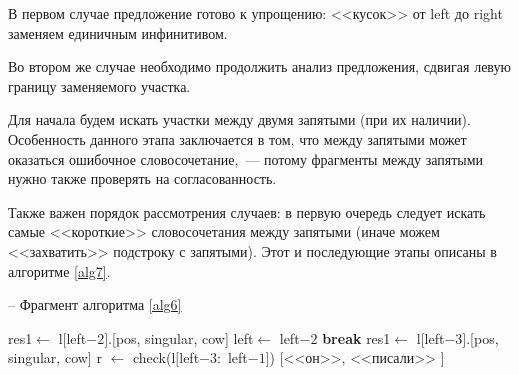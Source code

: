 \documentclass[main]{subfiles}
\begin{document}
В первом случае предложение готово к упрощению: <<кусок>> от left до right заменяем единичным инфинитивом.

Во втором же случае необходимо продолжить анализ предложения, сдвигая левую границу заменяемого участка.

Для начала будем искать участки между двумя запятыми (при их наличии). Особенность данного этапа заключается в том, что между запятыми может оказаться ошибочное словосочетание,~--- потому фрагменты между запятыми нужно также проверять на согласованность.

Также важен порядок рассмотрения случаев: в первую очередь следует искать самые <<короткие>> словосочетания между запятыми (иначе можем <<захватить>> подстроку с запятыми). Этот и последующие этапы описаны в алгоритме \ref{alg7}.

\begin{algorithm}[!h]
	\caption{-- Фрагмент алгоритма \ref{alg6}}\label{alg7}
	\begin{algorithmic}[1]
	 
	\State res1$\gets$ l$[$left$-2]$.[pos, singular, cow]
	\State left$\gets$ left$-2$
	\State \textbf{break}
	\EndIf
	\EndFor
	 
	\State  res1$\gets$ l$[$left$-3]$.[pos, singular, cow]
	\State r $\gets$ check(l$[$left$-3:$ left$-1 ]$)
		\State \Return $[$<<он>>, <<писали>> $]$
	\end{algorithmic}
	\end{algorithm}
\end{document}
